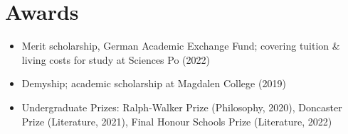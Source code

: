 \documentclass{cv_style}
\begin{document}
	\section{Awards}
		\begin{itemize}
                \item Merit scholarship, German Academic Exchange Fund; covering tuition \& living costs for study at Sciences Po (2022)
                \item Demyship; academic scholarship at Magdalen College (2019)
                \item Undergraduate Prizes: Ralph-Walker Prize (Philosophy, 2020), Doncaster Prize (Literature, 2021), Final Honour Schools Prize (Literature, 2022)
		\end{itemize}
\end{document}
